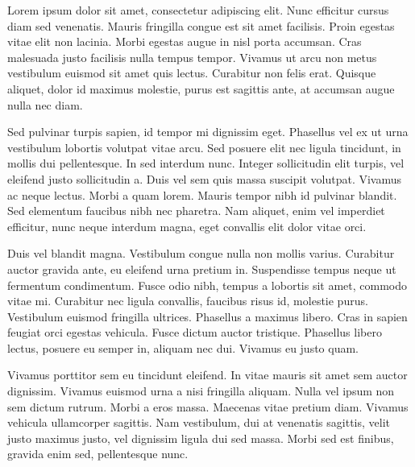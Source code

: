 Lorem ipsum dolor sit amet, consectetur adipiscing elit. Nunc efficitur cursus diam sed venenatis. Mauris fringilla congue est sit amet facilisis. Proin egestas vitae elit non lacinia. Morbi egestas augue in nisl porta accumsan. Cras malesuada justo facilisis nulla tempus tempor. Vivamus ut arcu non metus vestibulum euismod sit amet quis lectus. Curabitur non felis erat. Quisque aliquet, dolor id maximus molestie, purus est sagittis ante, at accumsan augue nulla nec diam.

Sed pulvinar turpis sapien, id tempor mi dignissim eget. Phasellus vel ex ut urna vestibulum lobortis volutpat vitae arcu. Sed posuere elit nec ligula tincidunt, in mollis dui pellentesque. In sed interdum nunc. Integer sollicitudin elit turpis, vel eleifend justo sollicitudin a. Duis vel sem quis massa suscipit volutpat. Vivamus ac neque lectus. Morbi a quam lorem. Mauris tempor nibh id pulvinar blandit. Sed elementum faucibus nibh nec pharetra. Nam aliquet, enim vel imperdiet efficitur, nunc neque interdum magna, eget convallis elit dolor vitae orci.

Duis vel blandit magna. Vestibulum congue nulla non mollis varius. Curabitur auctor gravida ante, eu eleifend urna pretium in. Suspendisse tempus neque ut fermentum condimentum. Fusce odio nibh, tempus a lobortis sit amet, commodo vitae mi. Curabitur nec ligula convallis, faucibus risus id, molestie purus. Vestibulum euismod fringilla ultrices. Phasellus a maximus libero. Cras in sapien feugiat orci egestas vehicula. Fusce dictum auctor tristique. Phasellus libero lectus, posuere eu semper in, aliquam nec dui. Vivamus eu justo quam.

Vivamus porttitor sem eu tincidunt eleifend. In vitae mauris sit amet sem auctor dignissim. Vivamus euismod urna a nisi fringilla aliquam. Nulla vel ipsum non sem dictum rutrum. Morbi a eros massa. Maecenas vitae pretium diam. Vivamus vehicula ullamcorper sagittis. Nam vestibulum, dui at venenatis sagittis, velit justo maximus justo, vel dignissim ligula dui sed massa. Morbi sed est finibus, gravida enim sed, pellentesque nunc. 
